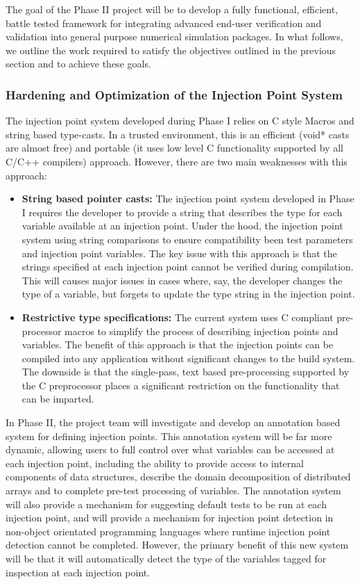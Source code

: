 The goal of the Phase II project will be to develop a fully functional, efficient, battle tested framework 
for integrating advanced end-user verification and validation into general purpose numerical simulation packages. In what follows, we outline
the work required to satisfy the objectives outlined in the previous section and to achieve these goals. 

\subsubsection{Hardening and Optimization of the Injection Point System}

The injection point system developed during Phase I relies on C style Macros and string based type-casts. In a trusted environment, this is an efficient (void* casts are almost free) and portable (it uses low level C functionality supported by all C/C++ compilers) approach. However, there are two main weaknesses with this approach:

\begin{itemize}
 \item {\bf String based pointer casts:} The injection point system developed in Phase I requires the developer to provide a string that describes the type for each variable available at an injection point. Under the hood, the injection point system using string comparisons to ensure compatibility been test parameters and injection point variables. The key issue with this approach is that the strings specified at each injection point cannot be verified during compilation.  This will causes major issues in cases where, say, the developer changes the type of a variable, but forgets to update the type string in the injection point.  
  
 \item {\bf Restrictive type specifications:} The current system uses C compliant pre-processor macros to simplify the process of describing injection points and variables. The benefit of this approach is that the injection points can be compiled into any application without significant changes to the build system. The downside is that the single-pass, text based pre-processing supported by the C preprocessor places a significant restriction on the functionality that can be imparted.
\end{itemize}
 
In Phase II, the project team will investigate and develop an annotation based system for defining injection points. This annotation system will be far more dynamic, allowing users to full control over what variables can be accessed at each injection point, including the ability to provide access to internal components of data structures, describe the domain decomposition of distributed arrays and to complete pre-test processing of variables. The annotation system will also provide a mechanism for suggesting default tests to be run at each injection point, and will provide a mechanism for injection point detection in non-object orientated programming languages where runtime injection point detection cannot be completed. However, the primary benefit of this new system will be that it will automatically detect the type of the variables tagged for inspection at each injection point.  

